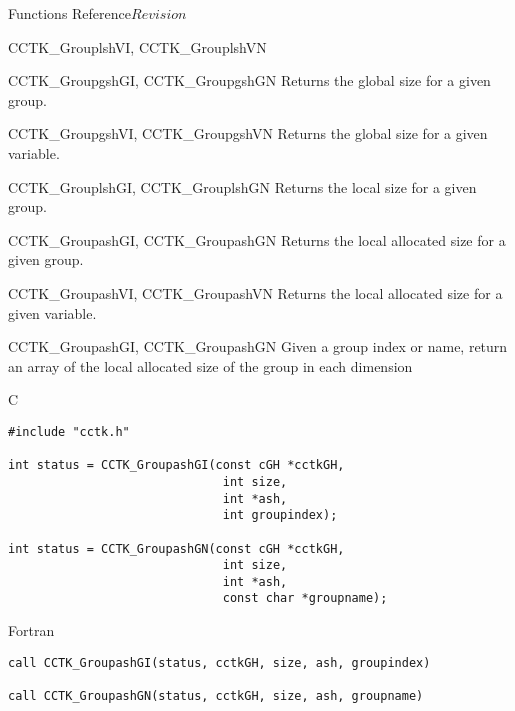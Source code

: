 \begin{cactuspart}{ Functions Reference}{}{$Revision$}
\begin{FunctionDescription}{CCTK\_GrouplshVI, CCTK\_GrouplshVN}
\begin{SeeAlsoSection}
\begin{SeeAlso}{CCTK\_GroupgshGI, CCTK\_GroupgshGN}
Returns the global size for a given group.
\end{SeeAlso}
\begin{SeeAlso}{CCTK\_GroupgshVI, CCTK\_GroupgshVN}
Returns the global size for a given variable.
\end{SeeAlso}
\begin{SeeAlso}{CCTK\_GrouplshGI, CCTK\_GrouplshGN}
Returns the local size for a given group.
\end{SeeAlso}
\begin{SeeAlso}{CCTK\_GroupashGI, CCTK\_GroupashGN}
Returns the local allocated size for a given group.
\end{SeeAlso}
\begin{SeeAlso}{CCTK\_GroupashVI, CCTK\_GroupashVN}
Returns the local allocated size for a given variable.
\end{SeeAlso}
\end{SeeAlsoSection}
\end{FunctionDescription}


\begin{FunctionDescription}{CCTK\_GroupashGI, CCTK\_GroupashGN}
\label{CCTK-GroupashGI}
\label{CCTK-GroupashGN}
Given a group index or name, return an array of the local allocated size
of the group in each dimension

\begin{SynopsisSection}
\begin{Synopsis}{C}
\begin{verbatim}
#include "cctk.h"

int status = CCTK_GroupashGI(const cGH *cctkGH,
                              int size,
                              int *ash,
                              int groupindex);

int status = CCTK_GroupashGN(const cGH *cctkGH,
                              int size,
                              int *ash,
                              const char *groupname);
\end{verbatim}
\end{Synopsis}
\begin{Synopsis}{Fortran}
\begin{verbatim}
call CCTK_GroupashGI(status, cctkGH, size, ash, groupindex)

call CCTK_GroupashGN(status, cctkGH, size, ash, groupname)


\end{verbatim}
\end{Synopsis}
\end{SynopsisSection}
\end{FunctionDescription}
\end{cactuspart}
